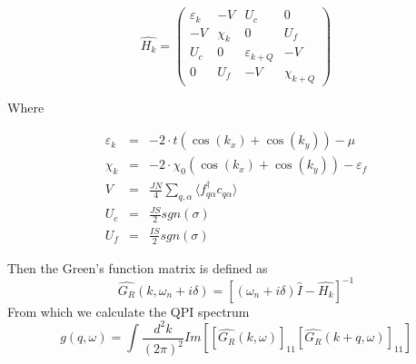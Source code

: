 \documentclass[11pt, oneside]{article}
\begin{document}
$$ \hat{H_k} = 
\left( \begin{array}{cccc}
\varepsilon _{k} & -V & U_{c} & 0 \\
-V & \chi _{k} & 0 & U_{f} \\
U_{c} & 0 & \varepsilon _{k+Q} & -V \\
0 & U_{f} & -V & \chi _{k+Q}
\end{array}\right) $$

Where

\begin{eqnarray*}
\varepsilon_k &=& -2 \cdot t (\cos(k_x) + \cos(k_y)) - \mu \\
\chi_k &=& -2 \cdot \chi_0 (\cos(k_x) + \cos(k_y)) - \varepsilon_f \\
V &=& \frac{J N}{4} \sum_{q,\alpha} \langle f_{q\alpha}^\dagger c_{q\alpha} \rangle \\
U_c &=& \frac{J S}{2} sgn(\sigma) \\
U_f &=& \frac{I S}{2} sgn(\sigma)
\end{eqnarray*}

Then the Green's function matrix is defined as
$$ \hat{G_R}(k,\omega_n+i\delta) = [(\omega_n+i\delta)\hat{I} - \hat{H_k}]^{-1} $$
From which we calculate the QPI spectrum
$$ g(q,\omega)=\int \frac{d^2k}{(2 \pi)^2}Im[ [\hat{G_R}(k,\omega)]_{11}[\hat{G_R}(k+q,\omega)]_{11}] $$
\end{document}
